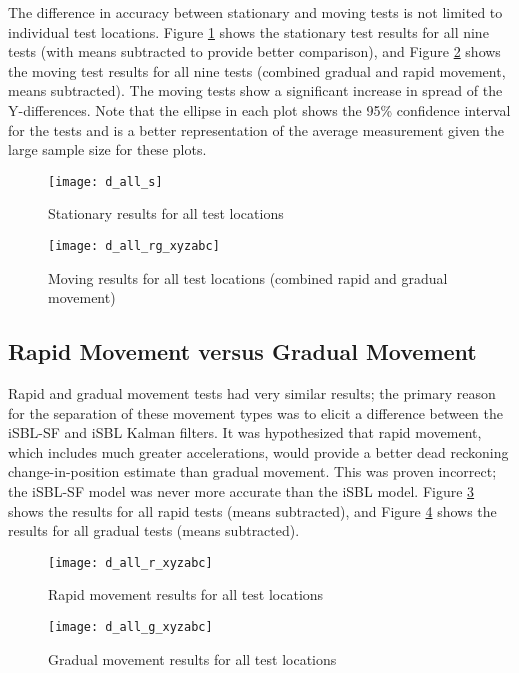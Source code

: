 \documentclass[11pt]{ucthesisCP}
\begin{document}
The difference in accuracy between stationary and moving tests is not limited to individual test locations. Figure \ref{fig:d_all_s} shows the stationary test results for all nine tests (with means subtracted to provide better comparison), and Figure \ref{fig:d_all_rg_xyzabc} shows the moving test results for all nine tests (combined gradual and rapid movement, means subtracted). The moving tests show a significant increase in spread of the Y-differences. Note that the ellipse in each plot shows the 95\% confidence interval for the tests and is a better representation of the average measurement given the large sample size for these plots.

\begin{figure}[htbp]
	\centering
	\texttt{[image: d\_all\_s]}
	\caption{Stationary results for all test locations}
	\label{fig:d_all_s}
\end{figure}

\begin{figure}[htbp]
	\centering
	\texttt{[image: d\_all\_rg\_xyzabc]}
	\caption{Moving results for all test locations (combined rapid and gradual movement)}
	\label{fig:d_all_rg_xyzabc}
\end{figure}

\subsection{Rapid Movement versus Gradual Movement} \label{ssec:6s2s4}
Rapid and gradual movement tests had very similar results; the primary reason for the separation of these movement types was to elicit a difference between the iSBL-SF and iSBL Kalman filters. It was hypothesized that rapid movement, which includes much greater accelerations, would provide a better dead reckoning change-in-position estimate than gradual movement. This was proven incorrect; the iSBL-SF model was never more accurate than the iSBL model. Figure \ref{fig:d_all_r_xyzabc} shows the results for all rapid tests (means subtracted), and Figure \ref{fig:d_all_g_xyzabc} shows the results for all gradual tests (means subtracted). 

\begin{figure}[htbp]
	\centering
	\texttt{[image: d\_all\_r\_xyzabc]}
	\caption{Rapid movement results for all test locations}
	\label{fig:d_all_r_xyzabc}
\end{figure}

\begin{figure}[htbp]
	\centering
	\texttt{[image: d\_all\_g\_xyzabc]}
	\caption{Gradual movement results for all test locations}
	\label{fig:d_all_g_xyzabc}
\end{figure}
\end{document}
